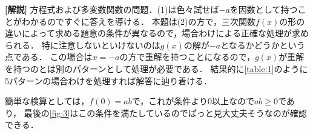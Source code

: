 \documentclass[a4paper,10pt]{ltjsarticle}
\begin{document}
\begin{multicols}{2}
  \vspace{10pt}
  {\bf[解説]}
  方程式および多変数関数の問題．(1)は色々試せば$-a$を因数として持つことがわかるのですぐに答えを導ける．
  本題は(2)の方で，三次関数$f(x)$の形の違いによって求める題意の条件が異なるので，場合わけによる正確な処理が求められる．
  特に注意しないといけないのは$g(x)$の解が$-a$となるかどうかという点である．
  この場合は$x=-a$の方で重解を持つことになるので，$g(x)$が重解を持つのとは別のパターンとして処理が必要である．
  結果的に\cref{table:1}のように5パターンの場合わけを処理すれば解答に辿り着ける．

  簡単な検算としては，$f(0)=ab$で，これが条件より$0$以上なので$ab\ge 0$であり，
  最後の\cref{fig:3}はこの条件を満たしているのでぱっと見大丈夫そうなのが確認できる．

  \newpage
\end{multicols}
\end{document}
